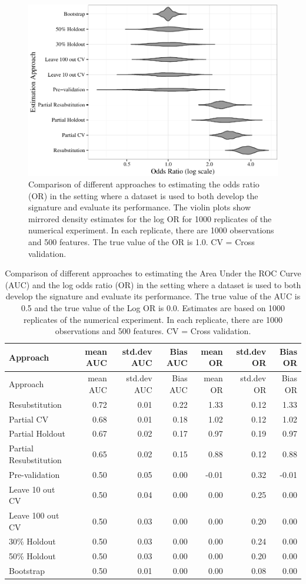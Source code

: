 \documentclass[11pt,]{article}
\begin{document}
\begin{figure}[htbp]
\centering
\includegraphics{paper-revised_files/figure-latex/cvsims2-1.pdf}
\caption{Comparison of different approaches to estimating the odds ratio
(OR) in the setting where a dataset is used to both develop the
signature and evaluate its performance. The violin plots show mirrored
density estimates for the log OR for 1000 replicates of the numerical
experiment. In each replicate, there are 1000 observations and 500
features. The true value of the OR is 1.0. CV = Cross validation.
\label{fig2}}
\end{figure}

\begin{longtable}[c]{@{}lrrrrrr@{}}
\caption{Comparison of different approaches to estimating the Area Under
the ROC Curve (AUC) and the log odds ratio (OR) in the setting where a
dataset is used to both develop the signature and evaluate its
performance. The true value of the AUC is 0.5 and the true value of the
Log OR is 0.0. Estimates are based on 1000 replicates of the numerical
experiment. In each replicate, there are 1000 observations and 500
features. CV = Cross validation.}\tabularnewline
\toprule
Approach & mean AUC & std.dev AUC & Bias AUC & mean OR & std.dev OR &
Bias OR\tabularnewline
\midrule
\endfirsthead
\toprule
Approach & mean AUC & std.dev AUC & Bias AUC & mean OR & std.dev OR &
Bias OR\tabularnewline
\midrule
\endhead
Resubstitution & 0.72 & 0.01 & 0.22 & 1.33 & 0.12 & 1.33\tabularnewline
Partial CV & 0.68 & 0.01 & 0.18 & 1.02 & 0.12 & 1.02\tabularnewline
Partial Holdout & 0.67 & 0.02 & 0.17 & 0.97 & 0.19 & 0.97\tabularnewline
Partial Resubstitution & 0.65 & 0.02 & 0.15 & 0.88 & 0.12 &
0.88\tabularnewline
Pre-validation & 0.50 & 0.05 & 0.00 & -0.01 & 0.32 &
-0.01\tabularnewline
Leave 10 out CV & 0.50 & 0.04 & 0.00 & 0.00 & 0.25 & 0.00\tabularnewline
Leave 100 out CV & 0.50 & 0.03 & 0.00 & 0.00 & 0.20 &
0.00\tabularnewline
30\% Holdout & 0.50 & 0.03 & 0.00 & 0.00 & 0.24 & 0.00\tabularnewline
50\% Holdout & 0.50 & 0.03 & 0.00 & 0.00 & 0.20 & 0.00\tabularnewline
Bootstrap & 0.50 & 0.01 & 0.00 & 0.00 & 0.08 & 0.00\tabularnewline
\bottomrule
\end{longtable}
\end{document}
